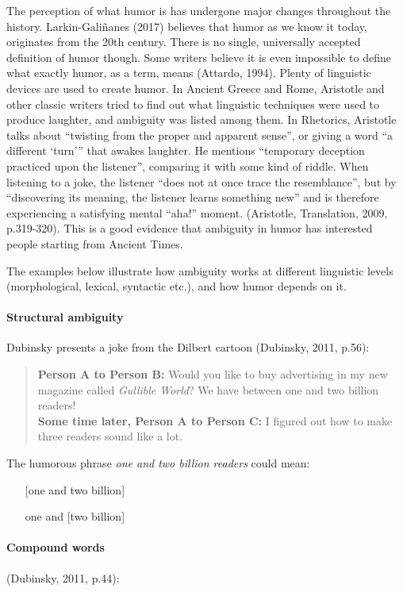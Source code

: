 \documentclass[10pt]{article}
\begin{document}
The perception of what humor is has undergone major changes throughout the history. Larkin-Galiñanes (2017) believes that humor as we know it today, originates from the 20th century. There is no single, universally accepted definition of humor though. Some writers believe it is even impossible to define what exactly humor, as a term, means (Attardo, 1994).
Plenty of linguistic devices are used to create humor. In Ancient Greece and Rome, Aristotle and other classic writers tried to find out what linguistic techniques were used to produce laughter, and ambiguity was listed among them. In Rhetorics, Aristotle talks about “twisting from the proper and apparent sense”, or giving a word “a different ‘turn’” that awakes laughter. He mentions “temporary deception practiced upon the listener”, comparing it with some kind of riddle. When listening to a joke, the listener “does not at once trace the resemblance”, but by “discovering its meaning, the listener learns something new” and is therefore experiencing a satisfying mental “aha!” moment. (Aristotle, Translation, 2009, p.319-320). This is a good evidence that ambiguity in humor has interested people starting from Ancient Times.  

The examples below illustrate how ambiguity works at different linguistic levels (morphological, lexical, syntactic etc.), and how humor depends on it.

\paragraph{Structural ambiguity} Dubinsky presents a joke from the Dilbert cartoon (Dubinsky, 2011, p.56): 

\begin{quote}
\textbf{Person A to Person B:} Would you like to buy advertising in my new magazine called 
\textit{Gullible World}? We have between one and two billion readers!\\
\textbf{Some time later, Person A to Person C:} I figured out how to make three readers sound like a lot.
\end{quote}


The humorous phrase \textit{one and two billion readers} could mean:
\begin{itemize}
    \item [[one and two] billion]
    \item [one] and [two billion]
\end{itemize}

\paragraph{Compound words} (Dubinsky, 2011, p.44): 
\end{document}
